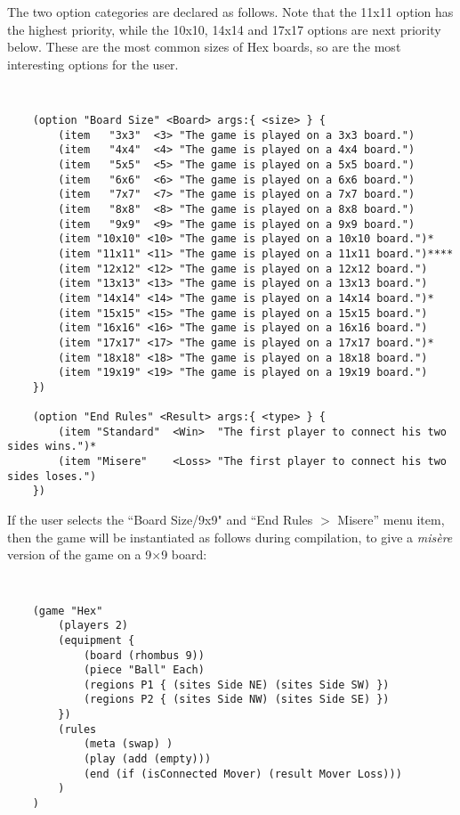 \noindent
The two option categories are declared as follows. 
Note that the 11x11 option has the highest priority, while the 10x10, 14x14 and 17x17 options are next priority below. 
These are the most common sizes of Hex boards, so are the most interesting options for the user.

{\tt
\begin{verbatim}
    (option "Board Size" <Board> args:{ <size> } {
        (item   "3x3"  <3> "The game is played on a 3x3 board.")   
        (item   "4x4"  <4> "The game is played on a 4x4 board.")   
        (item   "5x5"  <5> "The game is played on a 5x5 board.")   
        (item   "6x6"  <6> "The game is played on a 6x6 board.")   
        (item   "7x7"  <7> "The game is played on a 7x7 board.")   
        (item   "8x8"  <8> "The game is played on a 8x8 board.")   
        (item   "9x9"  <9> "The game is played on a 9x9 board.")   
        (item "10x10" <10> "The game is played on a 10x10 board.")*   
        (item "11x11" <11> "The game is played on a 11x11 board.")****   
        (item "12x12" <12> "The game is played on a 12x12 board.")   
        (item "13x13" <13> "The game is played on a 13x13 board.")   
        (item "14x14" <14> "The game is played on a 14x14 board.")*   
        (item "15x15" <15> "The game is played on a 15x15 board.")   
        (item "16x16" <16> "The game is played on a 16x16 board.")   
        (item "17x17" <17> "The game is played on a 17x17 board.")*   
        (item "18x18" <18> "The game is played on a 18x18 board.")   
        (item "19x19" <19> "The game is played on a 19x19 board.")   
    })

    (option "End Rules" <Result> args:{ <type> } {
        (item "Standard"  <Win>  "The first player to connect his two sides wins.")*   
        (item "Misere"    <Loss> "The first player to connect his two sides loses.")   
    })
\end{verbatim}
}

\noindent
If the user selects the ``Board Size/9x9" and ``End Rules $>$ Misere'' menu item, then the game will be instantiated as follows during compilation, to give a {\it mis\`{e}re} version of the game on a 9$\times$9 board:

{\tt
\begin{verbatim}
    (game "Hex"  
        (players 2)  
        (equipment { 
            (board (rhombus 9)) 
            (piece "Ball" Each)
            (regions P1 { (sites Side NE) (sites Side SW) })
            (regions P2 { (sites Side NW) (sites Side SE) })
        })  
        (rules 
            (meta (swap) )
            (play (add (empty))) 
            (end (if (isConnected Mover) (result Mover Loss))) 
        )
    )
\end{verbatim}
}

